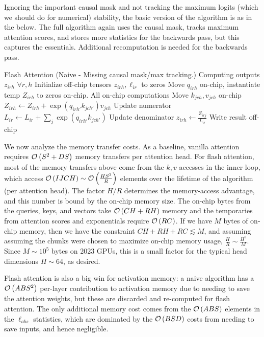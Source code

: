 \documentclass[11pt]{article}
\begin{document}
Ignoring the important causal mask and not tracking the maximum logits (which we should do for
numerical) stability, the basic version of the algorithm is as in the below. The full
algorithm again uses the causal mask, tracks maximum attention scores, and stores more statistics
for the backwards pass, but this captures the essentials. Additional recomputation is needed for the
backwards pass.
\begin{algo}{Flash Attention (Naive - Missing causal mask/max tracking.)}
 \Comment Computing outputs $ z _{ irh } $ $ \forall r, h $
\State Initialize off-chip tensors $ z _{ irh },  \ell _{ ir }$ to zeros
\State Move  $ q _{ irh }$ on-chip, instantiate temp $Z _{ irh }$ to zeros on-chip.
 \Comment All on-chip computations
    \State Move  $ k_{ jch },v _{ jch }$ on-chip
    \State $ Z _{ irh } \gets   Z _{ irh } +\exp \left ( q _{ irh' } k _{ jch' }  \right ) v _{ jch }$ \Comment Update numerator
    \State $ L _{ ir } \gets   L _{ ir } +\sum _{ j }\exp \left ( q _{ irh' } k _{ jch' }  \right ) $ \Comment Update denominator
\EndFor
\State $ z _{ irh } \gets \frac{Z _{ irj }}{L _{ ir }}$ \Comment Write result off-chip
\EndFor
\label{algo_fa_basic}
\end{algo}

We now analyze the memory transfer costs. As a baseline, vanilla attention requires $ \mathcal{O} \left( S
^{ 2 }+ DS \right)  $ memory transfers per attention head.   For flash attention, most of the memory
transfers above come from the $k, v$ accesses in the inner loop, which access $ \mathcal{O} \left( IJCH
\right) \sim  \mathcal{O} \left( \frac{ HS ^{ 2 } }{ R } \right)$ elements over the lifetime of the
algorithm (per attention head). The factor $ H/R $ determines the memory-access advantage, and this
number is bound by the on-chip memory size. The on-chip bytes from the queries, keys, and vectors
take $ \mathcal{O} \left( CH + RH \right)  $ memory and the temporaries from attention scores and
exponentials require $ \mathcal{O} \left( RC \right)$. If we have $ M $ bytes of on-chip memory, then we
have the constraint $ CH + RH + RC \lesssim  M  $, and assuming assuming the chunks were chosen to
maximize on-chip memory usage, $ \frac{ H }{ R } \sim  \frac{ H ^{ 2 } }{ M } $. Since $ M \sim 10
^{ 5 } $ bytes on 2023 GPUs, this is a small factor for the typical head dimensions  $ H \sim 64 $,
as desired.

Flash attention is also a big win for activation memory: a naive algorithm has a $ \mathcal{O} \left( ABS
^{ 2 } \right)  $ per-layer contribution to activation memory due to needing to save the attention
weights, but these are discarded and re-computed for flash attention.  The only additional memory
cost comes from the $ \mathcal{O} \left( ABS \right)  $ elements in the $ \ell _{ abs } $ statistics, which are
dominated by the $ \mathcal{O} \left( BSD \right)  $ costs from needing to save inputs, and hence negligible.
\end{document}
